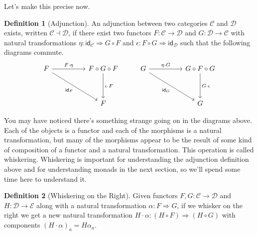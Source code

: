 \documentclass[12pt]{article}
\theoremstyle{definition}
\newtheorem{definition}{Definition}
\begin{document}
Let's make this precise now.
\begin{definition}[Adjunction]
    An adjunction between two categories $\mathcal{C}$ and $\mathcal{D}$ exists, written $\mathcal{C} \dashv \mathcal{D}$, if there exist two functors $F:\mathcal{C} \rightarrow \mathcal{D}$ and $G:\mathcal{D} \rightarrow \mathcal{C}$ with natural transformations $\eta : \mathsf{id}_\mathcal{C} \Rightarrow G \circ F$ and $\epsilon: F \circ G \Rightarrow \mathsf{id}_\mathcal{D}$ such that the following diagrams commute.
    \[\begin{tikzcd}
            F && {F \circ G \circ F} & G && {G \circ F \circ G} \\
            \\
            && F &&& G
            \arrow["{F \cdot \eta}", from=1-1, to=1-3]
            \arrow["{\epsilon \cdot F}", from=1-3, to=3-3]
            \arrow["{\mathsf{id}_F}"', from=1-1, to=3-3]
            \arrow["{\eta \cdot G}", from=1-4, to=1-6]
            \arrow["{G \cdot \epsilon}", from=1-6, to=3-6]
            \arrow["{\mathsf{id}_G}"', from=1-4, to=3-6]
        \end{tikzcd}\]
\end{definition}
You may have noticed there's something strange going on in the diagrams above.
Each of the objects is a functor and each of the morphisms is a natural transformation, but many of the morphisms appear to be the result of some kind of composition of a functor and a natural transformation.
This operation is called whiskering.
Whiskering is important for understanding the adjunction definition above and for understanding monads in the next section, so we'll spend some time here to understand it.
\begin{definition}[Whiskering on the Right]
    Given functors $F,G: \mathcal{C} \rightarrow \mathcal{D}$ and $H:\mathcal{D} \rightarrow \mathcal{E}$ along with a natural transformation $\alpha:F \Rightarrow G$, if we whisker on the right we get a new natural transformation $H\cdot\alpha : (H \circ F) \Rightarrow (H \circ G)$ with components $(H\cdot\alpha)_a=H\alpha_a$.
\end{definition}
\end{document}
